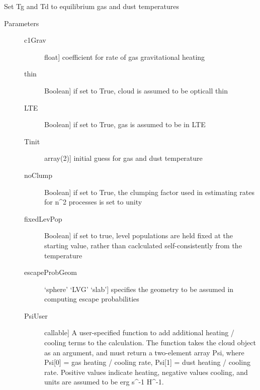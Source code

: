 \documentclass[letterpaper,10pt,english]{sphinxmanual}
\begin{document}
\begin{fulllineitems}

\begin{fulllineitems}
\label{fulldoc:despotic.cloud.setTempEq}
Set Tg and Td to equilibrium gas and dust temperatures
\begin{description}
\item[{Parameters}] \leavevmode\begin{description}
\item[{c1Grav}] \leavevmode{[}float{]}
coefficient for rate of gas gravitational heating

\item[{thin}] \leavevmode{[}Boolean{]}
if set to True, cloud is assumed to be opticall thin

\item[{LTE}] \leavevmode{[}Boolean{]}
if set to True, gas is assumed to be in LTE

\item[{Tinit}] \leavevmode{[}array(2){]}
initial guess for gas and dust temperature

\item[{noClump}] \leavevmode{[}Boolean{]}
if set to True, the clumping factor used in estimating
rates for n\textasciicircum{}2 processes is set to unity

\item[{fixedLevPop}] \leavevmode{[}Boolean{]}
if set to true, level populations are held fixed
at the starting value, rather than caclculated
self-consistently from the temperature

\item[{escapeProbGeom}] \leavevmode{[}`sphere' \textbar{} `LVG' \textbar{} `slab'{]}
specifies the geometry to be assumed in computing escape
probabilities

\item[{PsiUser}] \leavevmode{[}callable{]}
A user-specified function to add additional heating /
cooling terms to the calculation. The function takes the
cloud object as an argument, and must return a two-element
array Psi, where Psi{[}0{]} = gas heating / cooling rate,
Psi{[}1{]} = dust heating / cooling rate. Positive values
indicate heating, negative values cooling, and units are
assumed to be erg s\textasciicircum{}-1 H\textasciicircum{}-1.


\end{description}
\end{description}
\end{fulllineitems}
\end{fulllineitems}
\end{document}
